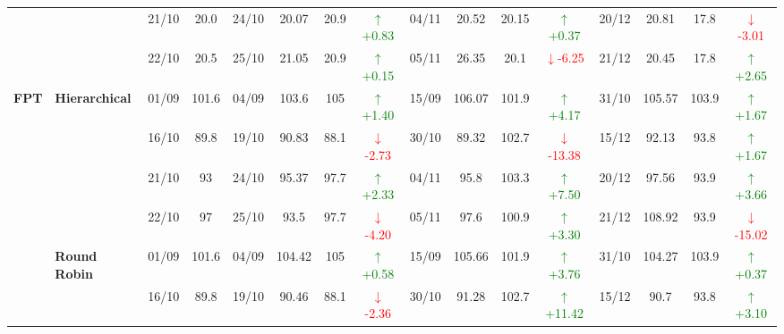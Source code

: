 \documentclass{ieeeaccess}
\begin{document}
{\begin{longtable}{llcc|cccc|cccc|cccc}
&
& 21/10 & 20.0 & 24/10 & 20.07 & 20.9 & \textcolor{green}{\(\uparrow\)+0.83} & 04/11 & 20.52 & 20.15 & \textcolor{green}{\(\uparrow\)+0.37} & 20/12 & 20.81 & 17.8 & \textcolor{red}{\(\downarrow\)-3.01} \\

&
& 22/10 & 20.5 & 25/10 & 21.05 & 20.9 & \textcolor{green}{\(\uparrow\)+0.15} & 05/11 & 26.35 & 20.1 & \textcolor{red}{\(\downarrow\)-6.25} & 21/12 & 20.45 & 17.8 & \textcolor{green}{\(\uparrow\)+2.65} \\
\midrule



\multirow{12}{*}{\textbf{FPT}} 
& \textbf{Hierarchical}
& 01/09 & 101.6 & 04/09 & 103.6 & 105 & \textcolor{green}{\(\uparrow\)+1.40} & 15/09 & 106.07 & 101.9 & \textcolor{green}{\(\uparrow\)+4.17} & 31/10 & 105.57 & 103.9 & \textcolor{green}{\(\uparrow\)+1.67} \\

&
& 16/10 & 89.8 & 19/10 & 90.83 & 88.1 & \textcolor{red}{\(\downarrow\)-2.73} & 30/10 & 89.32 & 102.7 & \textcolor{red}{\(\downarrow\)-13.38} & 15/12 & 92.13 & 93.8 & \textcolor{green}{\(\uparrow\)+1.67} \\

&
& 21/10 & 93 & 24/10 & 95.37 & 97.7 & \textcolor{green}{\(\uparrow\)+2.33} & 04/11 & 95.8 & 103.3 & \textcolor{green}{\(\uparrow\)+7.50} & 20/12 & 97.56 & 93.9 & \textcolor{green}{\(\uparrow\)+3.66} \\

&
& 22/10 & 97 & 25/10 & 93.5 & 97.7 & \textcolor{red}{\(\downarrow\)-4.20} & 05/11 & 97.6 & 100.9 & \textcolor{green}{\(\uparrow\)+3.30} & 21/12 & 108.92 & 93.9 & \textcolor{red}{\(\downarrow\)-15.02} \\
\cmidrule(lr){2-16}


& \textbf{Round Robin}
& 01/09 & 101.6 & 04/09 & 104.42 & 105 & \textcolor{green}{\(\uparrow\)+0.58} & 15/09 & 105.66 & 101.9 & \textcolor{green}{\(\uparrow\)+3.76} & 31/10 & 104.27 & 103.9 & \textcolor{green}{\(\uparrow\)+0.37} \\

&
& 16/10 & 89.8 & 19/10 & 90.46 & 88.1 & \textcolor{red}{\(\downarrow\)-2.36} & 30/10 & 91.28 & 102.7 & \textcolor{green}{\(\uparrow\)+11.42} & 15/12 & 90.7 & 93.8 & \textcolor{green}{\(\uparrow\)+3.10} \\


\end{longtable}}
\end{document}
